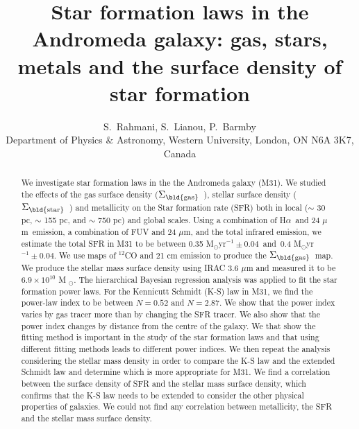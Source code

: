 \documentclass[useAMS,usenatbib]{mn2e}
\newcommand \sigmagas    {$\Sigma_{\rm \bld {gas }} $\ }
\newcommand \sigmastar    {$\Sigma_{\rm \bld {star }} $\ }
\newcommand \halpha    {H$\alpha $\ }
\newcommand \um    {$\mu$m\ }
\begin{document}
\title[STAR FORMATION LAWS IN M31]{Star formation laws in the Andromeda galaxy: gas, stars, metals and the surface density of star formation}
\author[S. Rahmani, et. al.]{S.~Rahmani, S.~Lianou, P.~Barmby\\
Department of Physics $\&$ Astronomy, Western University, London, ON N6A 3K7, Canada}
\maketitle

\begin{abstract} 
 We investigate star formation laws in the the Andromeda galaxy (M31). We studied the effects of the gas surface density (\sigmagas), stellar surface density (\sigmastar) and metallicity on the Star formation rate (SFR) both in local ($\sim$ 30 pc, $\sim$ 155 pc, and $\sim$ 750 pc) and global scales. Using a combination of \halpha and 24 \um emission, a combination of FUV and 24 $\mu$m, and the total infrared emission, we estimate the total SFR in M31 to be between 0.35 M$_{\odot}$yr$^{-1}\pm 0.04$~and~0.4 M$_{\odot}$yr$^{-1} \pm 0.04$. We use maps of $^{12}$CO and 21 cm emission to produce the \sigmagas map. We produce the stellar mass surface density using IRAC 3.6 $\mu$m and measured it to be $6.9 \times 10^{10}$ M $_{\odot}$. The hierarchical Bayesian regression analysis was applied to fit the star formation power laws. For the Kennicutt Schmidt (K-S) law in M31, we find the power-law index to be between $N = 0.52$ and $N = 2.87$. We show that the power index varies by gas tracer more than by changing the SFR tracer. We also show that the power index changes by distance from the centre of the galaxy. We that show the fitting method is important in the study of the star formation laws and that using different fitting methods leads to different power indices. We then repeat the analysis considering the stellar mass density in order to compare the K-S law and the extended Schmidt law and determine which is more appropriate for M31. We find a correlation between the surface density of SFR and the stellar mass surface density, which confirms that the K-S law needs to be extended to consider the other physical properties of galaxies. We could not find any correlation between metallicity, the SFR and the stellar mass surface density.

\end{abstract}
\end{document}
